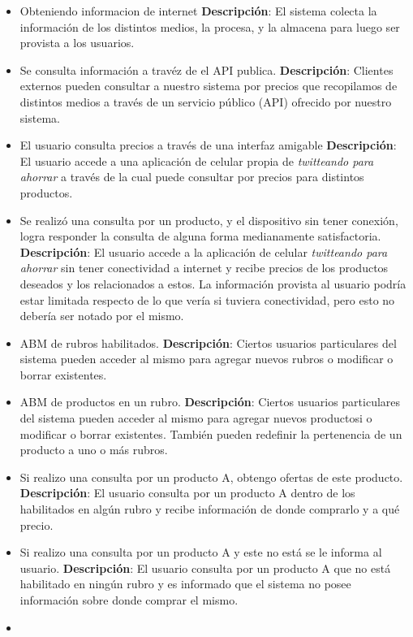 \begin{itemize}
\item
  Obteniendo informacion de internet \textbf{Descripción}: El sistema
  colecta la información de los distintos medios, la procesa, y la
  almacena para luego ser provista a los usuarios.
\item
  Se consulta información a travéz de el API publica.
  \textbf{Descripción}: Clientes externos pueden consultar a nuestro
  sistema por precios que recopilamos de distintos medios a través de un
  servicio público (API) ofrecido por nuestro sistema.
\item
  El usuario consulta precios a través de una interfaz amigable
  \textbf{Descripción}: El usuario accede a una aplicación de celular
  propia de \emph{twitteando para ahorrar} a través de la cual puede
  consultar por precios para distintos productos.
\item
  Se realizó una consulta por un producto, y el dispositivo sin tener
  conexión, logra responder la consulta de alguna forma medianamente
  satisfactoria. \textbf{Descripción}: El usuario accede a la aplicación
  de celular \emph{twitteando para ahorrar} sin tener conectividad a
  internet y recibe precios de los productos deseados y los relacionados
  a estos. La información provista al usuario podría estar limitada
  respecto de lo que vería si tuviera conectividad, pero esto no debería
  ser notado por el mismo.
\item
  ABM de rubros habilitados. \textbf{Descripción}: Ciertos usuarios
  particulares del sistema pueden acceder al mismo para agregar nuevos
  rubros o modificar o borrar existentes.
\item
  ABM de productos en un rubro. \textbf{Descripción}: Ciertos usuarios
  particulares del sistema pueden acceder al mismo para agregar nuevos
  productosi o modificar o borrar existentes. También pueden redefinir
  la pertenencia de un producto a uno o más rubros.
\item
  Si realizo una consulta por un producto A, obtengo ofertas de este
  producto. \textbf{Descripción}: El usuario consulta por un producto A
  dentro de los habilitados en algún rubro y recibe información de donde
  comprarlo y a qué precio.
\item
  Si realizo una consulta por un producto A y este no está se le informa
  al usuario. \textbf{Descripción}: El usuario consulta por un producto
  A que no está habilitado en ningún rubro y es informado que el sistema
  no posee información sobre donde comprar el mismo.
\item

\end{itemize}
